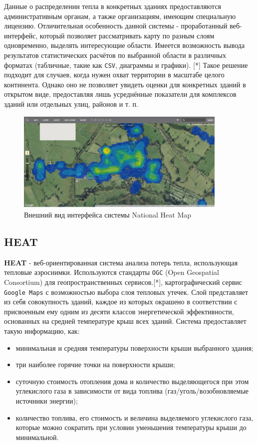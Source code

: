 	Данные о распределении тепла в конкретных зданиях предоставляются административным органам, а также организациям, имеющим специальную лицензию. Отличительная особенность данной системы - проработанный веб-интерфейс, который позволяет рассматривать карту по разным слоям одновременно, выделять интересующие области. Имеется возможность вывода результатов статистических расчётов по выбранной области в различных форматах (табличные, такие как \texttt{CSV}, диаграммы и графики). [*] Такое решение подходит для случаев, когда нужен охват территории в масштабе целого континента. Однако оно не позволяет увидеть оценки для конкретных зданий в открытом виде, предоставляя лишь усреднённые показатели для комплексов зданий или отдельных улиц, районов и т. п.

 	\begin{figure}[h!]
      \centering
      \includegraphics[width=0.9\textwidth]{images/screens/1_nhm.png}
      \caption{Внешний вид интерфейса системы National Heat Map}
      \label{screens:nhm}
    \end{figure}

\subsection{HEAT}

\par
	\textbf{HEAT} - веб-ориентированная система анализа потерь тепла, использующая тепловые аэроснимки. Используются стандарты \texttt{OGC} (Open Geospatial Consortium) для геопространственных сервисов.[*], картографический сервис \texttt{Google Maps} с возможностью выбора слоя тепловых утечек. Слой представляет из себя совокупность зданий, каждое из которых окрашено в соответствии с присвоенным ему одним из десяти классов энергетической эффективности, основанных на средней температуре крыш всех зданий. Система предоставляет такую информацию, как:

	\begin{itemize}
		\item минимальная и средняя температуры поверхности крыши выбранного здания;
		\item три наиболее горячие точки на поверхности крыши;
		\item суточную стоимость отопления дома и количество выделяющегося при этом углекислого газа в зависимости от вида топлива (газ/уголь/возобновляемые источники энергии);
		\item количество топлива, его стоимость и величина выделяемого углекислого газа, которые можно сократить при условии уменьшения температуры крыши до минимальной.
	\end{itemize}

